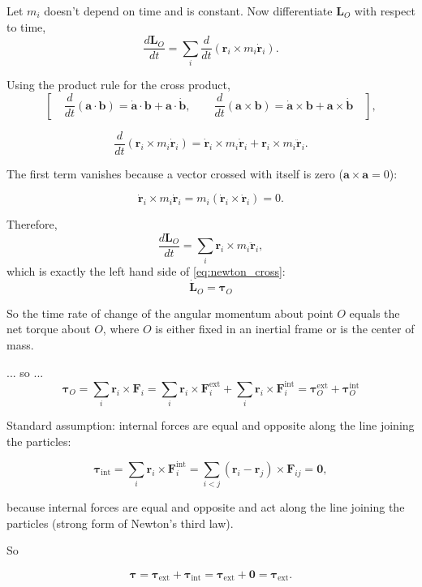 \documentclass[a4paper,11pt]{article}
\begin{document}
Let $m_i$ doesn't depend on time and is constant.  Now differentiate $\mathbf L_O$
with respect to time,
\[
\frac{d\mathbf L_O}{dt}
=
\sum_i \frac{d}{dt}\left(\mathbf r_i\times m_i\dot{\mathbf r}_i\right).
\]

Using the product rule for the cross product,
\[
\left[
\quad
\frac{d}{dt}(\mathbf a\cdot\mathbf b)
=
\dot{\mathbf a}\cdot\mathbf b+\mathbf a\cdot\dot{\mathbf b},
\qquad
\frac{d}{dt}(\mathbf a\times\mathbf b)
=
\dot{\mathbf a}\times\mathbf b+\mathbf a\times\dot{\mathbf b}
\quad
\right],
\]

\[
\frac{d}{dt}(\mathbf r_i\times m_i\dot{\mathbf r}_i)
=
\dot{\mathbf r}_i\times m_i\dot{\mathbf r}_i
+
\mathbf r_i\times m_i\ddot{\mathbf r}_i.
\]

The first term vanishes because a vector crossed with itself is
zero (\(\mathbf a\times\mathbf a=0\)):

\[
\dot{\mathbf r}_i\times m_i\dot{\mathbf r}_i
=
m_i(\dot{\mathbf r}_i\times \dot{\mathbf r}_i)
=
0.
\]

Therefore,
\[
\frac{d\mathbf L_O}{dt}
=
\sum_i \mathbf r_i\times m_i\ddot{\mathbf r}_i,
\]
which is exactly the left hand side of \eqref{eq:newton_cross}:
\begin{equation}
\dot{\mathbf L}_O
=
\boldsymbol\tau_O
\label{eq:torque}
\end{equation}

So the time rate of change of the angular momentum about point $O$ equals
the net torque about $O$, where $O$ is either fixed in an inertial frame or
is the center of mass.

... so ...
\[
\boldsymbol\tau_O
=
\sum_i \mathbf r_i \times \mathbf F_i
=
\sum_i \mathbf r_i \times \mathbf F_i^{\mathrm{ext}}
+
\sum_i \mathbf r_i \times \mathbf F_i^{\mathrm{int}}
=
\boldsymbol\tau^{\mathrm{ext}}_O + \boldsymbol\tau^{\mathrm{int}}_O
\]

Standard
assumption: internal forces are equal and opposite along the line joining the
particles:

\[
\boldsymbol\tau_{\mathrm{int}}
= \sum_i \mathbf r_i \times \mathbf F_i^{\mathrm{int}}
= \sum_{i<j} (\mathbf r_i-\mathbf r_j)\times \mathbf F_{ij}
= \mathbf 0,
\]

because internal forces are equal and opposite and act along the line
joining the particles (strong form of Newton's third law).



\hrulefill

So

\[
\boldsymbol\tau
=
\boldsymbol\tau_{\mathrm{ext}} + \boldsymbol\tau_{\mathrm{int}}
=
\boldsymbol\tau_{\mathrm{ext}} + \mathbf 0
=
\boldsymbol\tau_{\mathrm{ext}}.
\]
\end{document}
